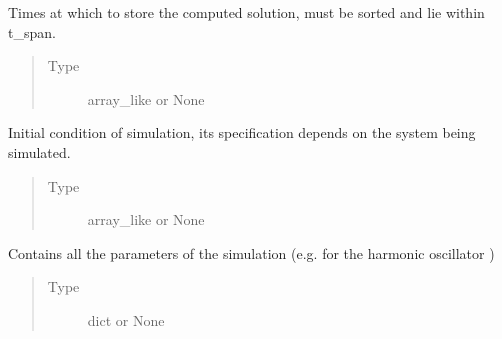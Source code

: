\documentclass[a4paper,landscape,10pt,english]{sphinxmanual}
\begin{document}
\begin{fulllineitems}
\begin{fulllineitems}
\label{\detokenize{code_docs/simulation_API.simulation:simulation_API.simulation.simulations.Simulation.t_eval}}
Times at which to store the computed solution, must be sorted and
lie within t\_span.
\begin{quote}\begin{description}
\item[{Type}] \leavevmode
array\_like or None

\end{description}\end{quote}

\end{fulllineitems}


\begin{fulllineitems}
\label{\detokenize{code_docs/simulation_API.simulation:simulation_API.simulation.simulations.Simulation.ini_cndtn}}
Initial condition of simulation, its specification depends on
the system being simulated.
\begin{quote}\begin{description}
\item[{Type}] \leavevmode
array\_like or None

\end{description}\end{quote}

\end{fulllineitems}


\begin{fulllineitems}
\label{\detokenize{code_docs/simulation_API.simulation:simulation_API.simulation.simulations.Simulation.params}}
Contains all the parameters of the simulation (e.g. for the harmonic
oscillator )
\begin{quote}\begin{description}
\item[{Type}] \leavevmode
dict or None


\end{description}
\end{quote}
\end{fulllineitems}
\end{fulllineitems}
\end{document}
